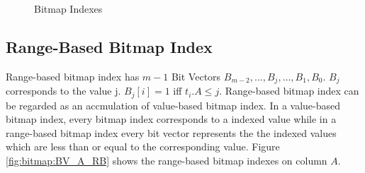 \documentclass[12pt, a4paper]{article}
\begin{document}
\begin{figure}
\hspace{0.01\linewidth}
\hspace{0.01\linewidth}
\caption{Bitmap Indexes}
\label{fig:bitmap}
\end{figure}

\subsection{Range-Based Bitmap Index}

Range-based bitmap index has $m-1$ Bit Vectors ${B_{m-2}, \ldots, B_j, \ldots, B_1, B_0}$. $B_j$ corresponds to the value j. $B_j[i]=1$ iff $t_i.A \le j$. Range-based bitmap index can be regarded as an accmulation of value-based bitmap index. In a value-based bitmap index, every bitmap index corresponds to a indexed value while in a range-based bitmap index every bit vector represents the the indexed values which are less than or equal to the corresponding value. Figure \ref{fig:bitmap:BV_A_RB} shows the range-based bitmap indexes on column $A$.
\end{document}
